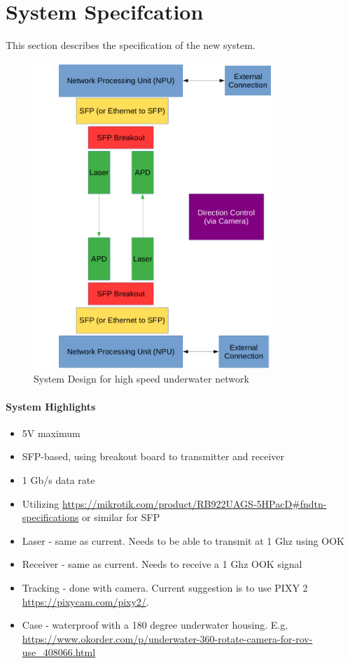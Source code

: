 \section{System Specifcation}
This section describes the specification of the new system.

\begin{figure}[H]
  \includegraphics[width=0.8\textwidth]{system_design.png}
  \caption{System Design for high speed underwater network}
  \label{fig:system-design}
\end{figure}

\paragraph{\textbf{System Highlights}}
\begin{itemize}
\item{5V maximum}
\item{\ac{SFP}-based, using breakout board to transmitter and receiver}
\item{1 Gb/s data rate}
\item{Utilizing
	\url{https://mikrotik.com/product/RB922UAGS-5HPacD#fndtn-specifications}
	or similar for SFP}
\item{Laser - same as current. Needs to be able to transmit at 1 Ghz using
	\ac{OOK}}
\item{Receiver - same as current. Needs to receive a 1 Ghz \ac{OOK} signal}
\item{Tracking - done with camera. Current suggestion is to use PIXY 2
	\url{https://pixycam.com/pixy2/}.}
\item{Case - waterproof with a 180 degree underwater housing. E.g.
	\url{https://www.okorder.com/p/underwater-360-rotate-camera-for-rov-use_408066.html}}
\end{itemize}


